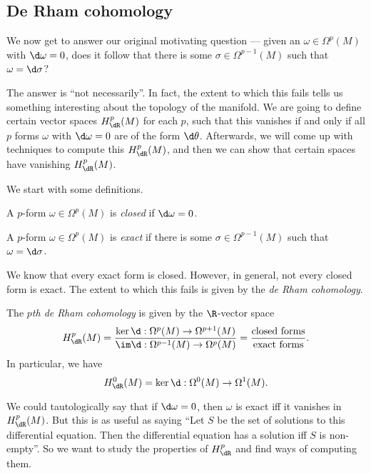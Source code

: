 \documentclass[a4paper]{article}
\begin{document}
\subsection{De Rham cohomology}
We now get to answer our original motivating question --- given an $\omega \in \Omega^p(M)$ with $\d \omega = 0$, does it follow that there is some $\sigma \in \Omega^{p - 1}(M)$ such that $\omega = \d \sigma$?

The answer is ``not necessarily''. In fact, the extent to which this fails tells us something interesting about the topology of the manifold. We are going to define certain vector spaces $H^p_{\dR}(M)$ for each $p$, such that this vanishes if and only if all $p$ forms $\omega$ with $\d \omega = 0$ are of the form $\d \theta$. Afterwards, we will come up with techniques to compute this $H^p_{\dR}(M)$, and then we can show that certain spaces have vanishing $H^p_{\dR}(M)$.

We start with some definitions.

\begin{defi}
  A $p$-form $\omega \in \Omega^p(M)$ is \emph{closed} if $\d \omega = 0$.
\end{defi}

\begin{defi}
  A $p$-form $\omega \in \Omega^p(M)$ is \emph{exact} if there is some $\sigma \in \Omega^{p - 1}(M)$ such that $\omega = \d \sigma$.
\end{defi}

We know that every exact form is closed. However, in general, not every closed form is exact. The extent to which this fails is given by the \emph{de Rham cohomology}.

\begin{defi}
  The \emph{$p$th de Rham cohomology} is given by the $\R$-vector space
  \[
    H^p_\dR (M) = \frac{\ker \d: \Omega^p(M) \to \Omega^{p + 1}(M)}{\im \d: \Omega^{p - 1}(M) \to \Omega^p(M)} = \frac{\text{closed forms}}{\text{exact forms}}.
  \]
  In particular, we have
  \[
    H^0_{\dR}(M) = \ker \d: \Omega^0(M) \to \Omega^1(M).
  \]
\end{defi}

We could tautologically say that if $\d \omega = 0$, then $\omega$ is exact iff it vanishes in $H^p_{\dR}(M)$. But this is as useful as saying ``Let $S$ be the set of solutions to this differential equation. Then the differential equation has a solution iff $S$ is non-empty''. So we want to study the properties of $H^p_{\dR}$ and find ways of computing them.
\end{document}
